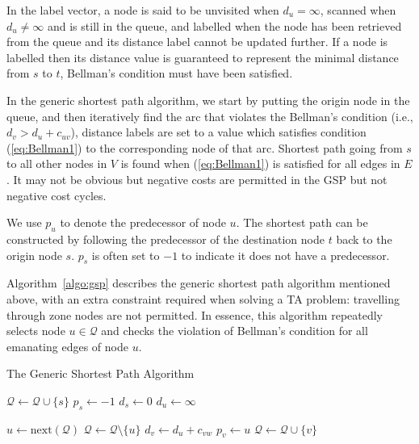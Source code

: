 In the label vector,
a node is said to be unvisited when $d_u = \infty$,
scanned when $d_u \neq \infty$ and is still in the queue,
and labelled when the node has been retrieved from the queue and its distance label cannot be updated further.
If a node is labelled then its distance value is guaranteed to represent the minimal distance from $s$ to $t$, Bellman's condition must have been satisfied.

In the generic shortest path algorithm,
we start by putting the origin node in the queue,
and then iteratively find the arc that violates the Bellman's condition (i.e., $d_v > d_u + c_{uv}$),
distance labels are set to a value which satisfies condition (\ref{eq:Bellman1}) to the corresponding node of that arc.
Shortest path going from $s$ to all other nodes in $V$ is found when (\ref{eq:Bellman1}) is satisfied for all edges in $E$.
It may not be obvious but negative costs are permitted in the GSP but not negative cost cycles.

We use $p_u$ to denote the predecessor of node $u$.
The shortest path can be constructed by following the predecessor of the destination node $t$ back to the origin node $s$. $p_s$ is often set to $-1$ to indicate it does not have a predecessor.


Algorithm~\ref{algo:gsp} \citep{Klunder} describes the generic shortest path algorithm mentioned above,
with an extra constraint required when solving a TA problem: travelling through zone nodes are not permitted.
In essence, this algorithm repeatedly selects node $u\in\mathcal{Q}$ and checks the violation of Bellman's condition for all emanating edges of node $u$.
\begin{algorithm}
    \caption{The Generic Shortest Path Algorithm}
    \label{algo:gsp}
    \begin{algorithmic}[1]
        \State $\mathcal{Q} \gets \mathcal{Q} \cup \{s\}$ 
        \State $p_s \gets -1$ 
        \State $d_s \gets 0$
         
        \State $d_u \gets \infty$
    \EndFor

    \State $ u \gets \text{next}(\mathcal{Q}) $ 
    \State $ \mathcal{Q} \gets \mathcal{Q} \setminus \{u\} $
     
    \State $d_v \gets d_u + c_{vw}$
    \State $p_v \gets u$
    \State $\mathcal{Q} \gets \mathcal{Q} \cup \{v\}$ 
\EndIf
                    \EndIf
                \EndFor
            \EndIf
        \EndWhile
    \EndProcedure
\end{algorithmic}
\end{algorithm}

